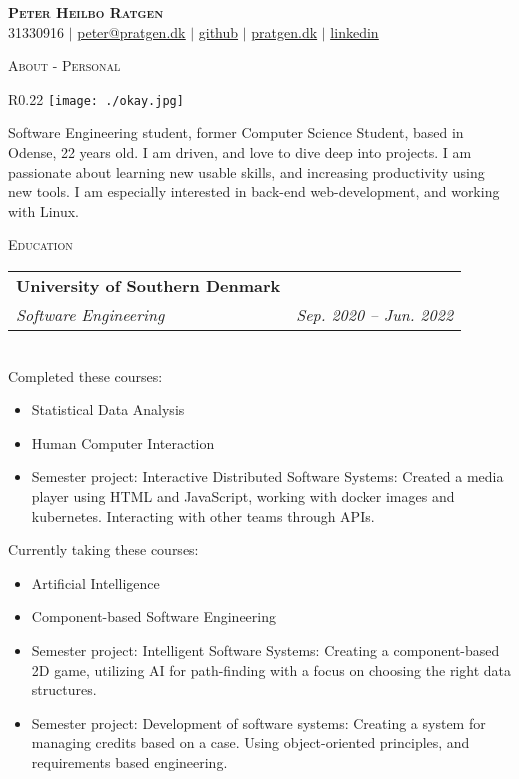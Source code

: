 \documentclass[11pt]{article}
\makeatletter
\newcommand{\resumeSubheading}[4]{
  \noindent\begin{tabular*}{0.98\textwidth}[t]{l@{\extracolsep{\fill}}r}
    \noindent \textbf{#1} & #2 \\ \vspace{-3pt} 
    \noindent \textit{\small#3} & \textit{\small #4} 
  \end{tabular*}\vspace{7pt}
}
\makeatother
\begin{document}
\begin{center}
  \textbf{\huge{\scshape{Peter Heilbo Ratgen}}}\\ 
  \vspace{0.2cm}
  \small 31330916 $|$
  \href{mailto:peter@pratgen.dk}{\underline{peter@pratgen.dk}} $|$
  \href{https://github.com/PeterRatgen }{\underline{github}} $|$
  \href{https://pratgen.dk}{\underline{pratgen.dk}} $|$
  \href{https://www.linkedin.com/in/peter-ratgen-a1236529/}{\underline{linkedin}}
\end{center}

\noindent\large{\scshape{About - Personal}} \newline
\noindent{\rule[0.3cm]{\textwidth}{0.4pt}}

\begin{wrapfigure}{R}{0.22\textwidth}
  \vspace{-0.7cm}
  \texttt{[image: ./okay.jpg]}
\end{wrapfigure}
\normalsize Software Engineering student, former Computer Science Student, based in Odense,
22 years old. I am driven, and love to dive deep into projects. I am passionate
about learning new usable skills, and increasing productivity using new tools. I
am especially interested in back-end web-development, and working with Linux. 

\vspace{0.3cm}
\noindent\large{\scshape{Education}} \newline
\noindent{\rule[0.3cm]{\textwidth}{0.4pt}}

\resumeSubheading{University of Southern Denmark}{}{Software Engineering}{Sep.
2020 -- Jun. 2022}\\\vspace{0.25cm}
{\indent\small Completed these courses:}
  \vspace{-0.3cm}
  {\small 
  \begin{itemize}
  \setlength{\itemsep}{-1pt}
    \item Statistical Data Analysis
    \item Human Computer Interaction
    \item Semester project: Interactive Distributed Software Systems:
      \subitem Created a media player using HTML and JavaScript, working with
      docker images and kubernetes. Interacting with other teams through APIs.
\end{itemize}} 
{\indent\small Currently taking these courses:}
  {\small 
  \begin{itemize}
  \setlength{\itemsep}{-1pt}
    \item Artificial Intelligence
    \item Component-based Software Engineering
    \item Semester project: Intelligent Software Systems:
      \subitem Creating a component-based 2D game, utilizing AI for
      path-finding with a focus on choosing the right data structures. 
    \item Semester project: Development of software systems:
      \subitem Creating a system for managing credits based on a case. Using
      object-oriented principles, and requirements based engineering.
  \end{itemize}} 
\end{document}
